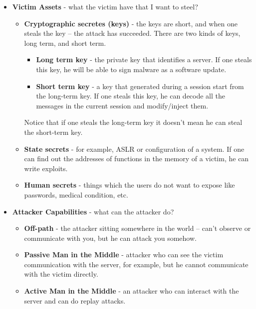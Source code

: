 \begin{itemize}
    \item \textbf{Victim Assets} - what the victim have that I want to steel? 
        \begin{itemize}
            \item \textbf{Cryptographic secretes (keys)} -  the keys are short,
            and when one steals the key – the attack has succeeded. There are
            two kinds of keys, long term, and short term.
                \begin{itemize}
                    \item \textbf{Long term key } - the private key that
                    identifies a server. If one steals this key, he will be able
                    to sign malware as a software update.
                    \item \textbf{Short term key} - a key that generated during
                    a session start from the long-term key. If one steals this
                    key, he can decode all the messages in the current session
                    and modify/inject them.
                \end{itemize}
                Notice that if one steals the long-term key it doesn't mean he
                can steal the short-term key.
            \item \textbf{State secrets} - for example, ASLR or configuration of
            a system. If one can find out the addresses of functions in the
            memory of a victim, he can write exploits. 
            \item \textbf{Human secrets} - things which the users do not want to
            expose like passwords, medical condition, etc.
        \end{itemize}
    \item \textbf{Attacker Capabilities} - what can the attacker do?
        \begin{itemize}
            \item \textbf{Off-path} - the attacker sitting somewhere in the
            world – can't observe or communicate with you, but he can attack you
            somehow. 
            \item \textbf{Passive Man in the Middle} - attacker who can see the
            victim communication with the server, for example, but he cannot
            communicate with the victim directly.
            \item \textbf{Active Man in the Middle} - an attacker who can
            interact with the server and can do replay attacks.

\end{itemize}
\end{itemize}
